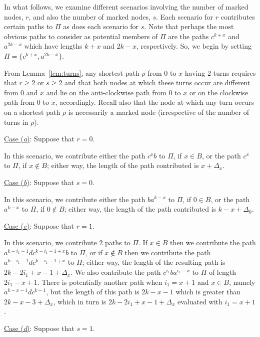\documentclass{article}
\begin{document}
In what follows, we examine different scenarios involving the number of marked nodes, $r$, and also the number of marked nodes, $s$. Each scenario for $r$ contributes certain paths to $\Pi$ as does each scenario for $s$. Note that perhaps the most obvious paths to consider as potential members of $\Pi$ are the paths $c^{k+x}$ and $a^{2k-x}$ which have lengths $k+x$ and $2k-x$, respectively. So, we begin by setting $\Pi=\{c^{k+x},a^{2k-x}\}$.

From Lemma~\ref{lem:turns}, any shortest path $\rho$ from $0$ to $x$ having $2$ turns requires that $r\geq 2$ or $s\geq 2$ and that both nodes at which these turns occur are different from $0$ and $x$ and lie on the anti-clockwise path from $0$ to $x$ or on the clockwise path from $0$ to $x$, accordingly. Recall also that the node at which any turn occurs on a shortest path $\rho$ is necessarily a marked node (irrespective of the number of turns in $\rho$).\smallskip

\noindent\underline{Case (\emph{a\/})}: Suppose that $r=0$.\smallskip

\noindent In this scenario, we contribute either the path $c^xb$ to $\Pi$, if $x\in B$, or the path $c^x$ to $\Pi$, if $x\not\in B$; either way, the length of the path contributed is $x+\Delta_x$.\smallskip

\noindent\underline{Case (\emph{b\/})}: Suppose that $s=0$.\smallskip

\noindent In this scenario, we contribute either the path $ba^{k-x}$ to $\Pi$, if $0\in B$, or the path $a^{k-x}$ to $\Pi$, if $0\not\in B$; either way, the length of the path contributed is $k-x+\Delta_0$.\smallskip

\noindent\underline{Case (\emph{c\/})}: Suppose that $r=1$.\smallskip

\noindent In this scenario, we contribute $2$ paths to $\Pi$. If $x\in B$ then we contribute the path $a^{k-i_1-1}dc^{k-i_1-1+x}b$ to $\Pi$, or if $x\not\in B$ then we contribute the path $a^{k-i_1-1}dc^{k-i_1-1+x}$ to $\Pi$; either way, the length of the resulting path is $ 2k-2i_1+x-1+\Delta_x$. We also contribute the path $c^{i_1}ba^{i_1-x}$ to $\Pi$ of length $2i_1-x+1$. There is potentially another path when $i_1=x+1$ and $x\in B$, namely $a^{k-x-1}dc^{k-1}$, but the length of this path is $2k-x-1$ which is greater than $2k-x-3+\Delta_x$, which in turn is $ 2k-2i_1+x-1+\Delta_x$ evaluated with $i_1=x+1$.\smallskip

\noindent\underline{Case (\emph{d\/})}: Suppose that $s=1$.\smallskip
\end{document}
